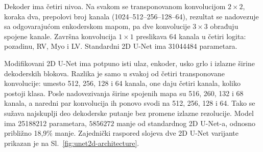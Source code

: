 \documentclass[11pt,a4paper]{article}
\begin{document}
Dekoder ima četiri nivoa. Na svakom se transponovanom konvolucijom $2\times2$, koraka dva,
prepolovi broj kanala (1024--512--256--128--64), rezultat se nadovezuje sa odgovarajućom
enkoderskom mapom, pa dve konvolucije $3\times3$ obrađuju spojene kanale. Završna konvolucija
$1\times1$ preslikava 64 kanala u četiri logita: pozadinu, RV, Myo i LV. Standardni 2D U-Net ima
\num{31044484} parametara.

Modifikovani 2D U-Net ima potpuno isti ulaz, enkoder, usko grlo i izlazne širine dekoderskih
blokova. Razlika je samo u svakoj od četiri transponovane konvolucije: umesto 512, 256, 128 i 64
kanala, one daju četiri kanala, koliko postoji klasa. Posle nadovezivanja širine spojenih mapa su
516, 260, 132 i 68 kanala, a naredni par konvolucija ih ponovo svodi na 512, 256, 128 i 64. Tako se
sužava najskuplji deo dekoderske putanje bez promene izlazne rezolucije. Model ima \num{25188212}
parametara, \(\num{5856272}\) manje od standardnog 2D U-Net-a, odnosno približno 18,9\% manje.
Zajednički raspored slojeva dve 2D U-Net varijante prikazan je na Sl.~\ref{fig:unet2d-architecture}.
\end{document}
